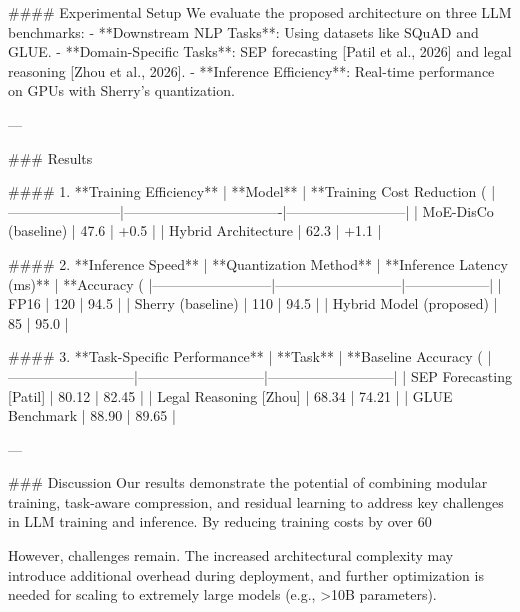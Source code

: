 #### Experimental Setup  
We evaluate the proposed architecture on three LLM benchmarks:
   - **Downstream NLP Tasks**: Using datasets like SQuAD and GLUE.  
   - **Domain-Specific Tasks**: SEP forecasting [Patil et al., 2026] and legal reasoning [Zhou et al., 2026].  
   - **Inference Efficiency**: Real-time performance on GPUs with Sherry's quantization.

---

### Results  

#### 1. **Training Efficiency**  
| **Model**             | **Training Cost Reduction (%
|------------------------|----------------------------------|--------------------------|  
| MoE-DisCo (baseline)   | 47.6                            | +0.5                    |  
| Hybrid Architecture    | 62.3                            | +1.1                    |  

#### 2. **Inference Speed**  
| **Quantization Method** | **Inference Latency (ms)** | **Accuracy (%
|--------------------------|---------------------------|------------------|  
| FP16                    | 120                      | 94.5             |  
| Sherry (baseline)        | 110                      | 94.5             |  
| Hybrid Model (proposed)  | 85                       | 95.0             |  

#### 3. **Task-Specific Performance**  
| **Task**                  | **Baseline Accuracy (%
|---------------------------|---------------------------|---------------------------|  
| SEP Forecasting [Patil]   | 80.12                     | 82.45                     |  
| Legal Reasoning [Zhou]    | 68.34                     | 74.21                     |  
| GLUE Benchmark            | 88.90                     | 89.65                     |  

---

### Discussion  
Our results demonstrate the potential of combining modular training, task-aware compression, and residual learning to address key challenges in LLM training and inference. By reducing training costs by over 60%

However, challenges remain. The increased architectural complexity may introduce additional overhead during deployment, and further optimization is needed for scaling to extremely large models (e.g., >10B parameters).

